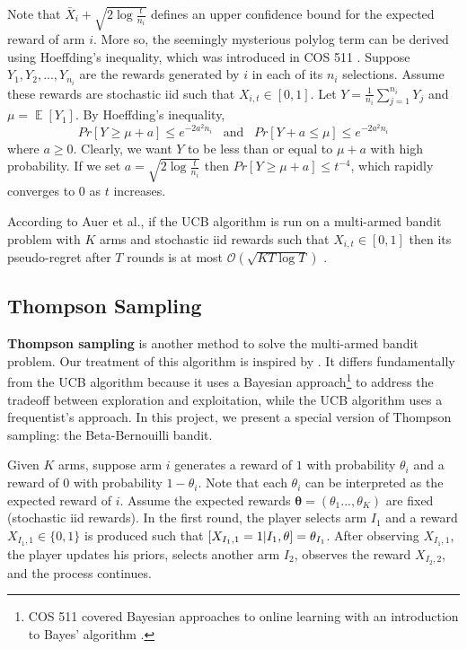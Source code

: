 \documentclass[12pt]{article}
\let\Pr\relax
\DeclareMathOperator*{\Pr}{\mathbb{P}}
\DeclareMathOperator*{\E}{\mathbb{E}}
\begin{document}
Note that $\bar{X}_{i}+\sqrt{2\log\frac{t}{n_{i}}}$ defines an upper confidence bound for the expected reward of arm $i$. More so, the seemingly mysterious polylog term can be derived using Hoeffding's inequality, which was introduced in COS 511 \cite{lecture8}. Suppose $Y_{1},Y_{2},...,Y_{n_{i}}$ are the rewards generated by $i$ in each of its $n_{i}$ selections. Assume these rewards are stochastic iid such that $X_{i,t}\in[0,1]$. Let $Y=\frac{1}{n_{i}}\sum_{j=1}^{n_{i}}Y_{j}$ and $\mu=\E[Y_{1}]$. By Hoeffding's inequality, 
\begin{equation} 
Pr[Y\geq\mu+a]\leq e^{-2a^2 n_{i}}\,\,\,\text{ and }\,\,\,Pr[Y+a\leq\mu]\leq e^{-2a^2 n_{i}}
\end{equation}
where $a\geq 0$. Clearly, we want $Y$ to be less than or equal to $\mu+a$ with high probability. If we set $a=\sqrt{2\log\frac{t}{n_{i}}}$ then $Pr[Y \geq\mu+a]\leq t^{-4}$, which rapidly converges to $0$ as $t$ increases.

According to Auer et al., if the UCB algorithm is run on a multi-armed bandit problem with $K$ arms and stochastic iid rewards such that $X_{i,t}\in[0,1]$ then its pseudo-regret after $T$ rounds is at most $\mathcal{O}(\sqrt{KT\log T})$ \cite{auer2002}.

\subsection{Thompson Sampling}

\textbf{Thompson sampling} \cite{thompson1933} is another method to solve the multi-armed bandit problem. Our treatment of this algorithm is inspired by \cite{russo2018}. It differs fundamentally from the UCB algorithm because it uses a Bayesian approach\footnote{COS 511 covered Bayesian approaches to online learning with an introduction to Bayes' algorithm \cite{lecture21}.} to address the tradeoff between exploration and exploitation, while the UCB algorithm uses a frequentist's approach. In this project, we present a special version of Thompson sampling: the Beta-Bernouilli bandit.

Given $K$ arms, suppose arm $i$ generates a reward of $1$ with probability $\theta_{i}$ and a reward of $0$ with probability $1-\theta_{i}$. Note that each $\theta_{i}$ can be interpreted as the expected reward of $i$. Assume the expected rewards $\boldsymbol{\theta}=(\theta_{1}...,\theta_{K})$ are fixed (stochastic iid rewards). In the first round, the player selects arm $I_{1}$ and a reward $X_{I_{1},1}\in\{0,1\}$ is produced such that $\Pr[X_{I_{1},1}=1|I_{1},\mathbf{\theta}]=\theta_{I_{1}}$. After observing $X_{I_{1},1}$, the player updates his priors, selects another arm $I_{2}$, observes the reward $X_{I_{2},2}$, and the process continues.
\end{document}
